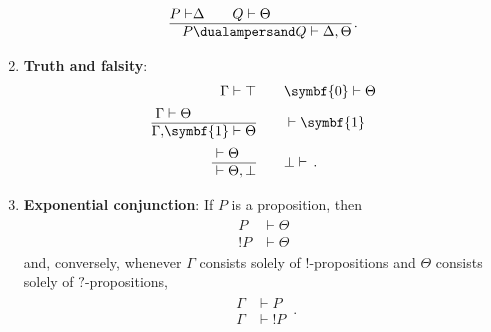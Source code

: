 \begin{enumerate}
\begin{gather}
\begin{aligned}
                    P\vdash&\Delta\qquad Q\vdash\Theta\\
                    \hline
                    P&\dualampersand Q\vdash\Delta,\Theta
                \end{aligned}\,.
            \end{gather}
        \item\textbf{Truth and falsity}:
            \begin{gather}
                \begin{aligned}
                    \Gamma\vdash\top &\qquad \symbf{0}\vdash\Theta\\
                    \begin{aligned}
                        \Gamma&\vdash\Theta\\
                        \hline
                        \Gamma,&\symbf{1}\vdash\Theta
                    \end{aligned}
                    &\qquad \vdash\symbf{1}
                    \\
                    \begin{aligned}
                        &\vdash\Theta\\
                        \hline
                        &\vdash\Theta,\bot
                    \end{aligned}
                    &\qquad \bot\vdash\,.
                \end{aligned}
            \end{gather}
        \item\textbf{Exponential conjunction}: If $P$ is a proposition, then
            \begin{gather}
                \begin{aligned}
                    P&\vdash\Theta\\
                    \hline
                    !P&\vdash\Theta
                \end{aligned}
            \end{gather}
            and, conversely, whenever $\Gamma$ consists solely of $!$-propositions and $\Theta$ consists solely of $?$-propositions,
            \begin{gather}
                \begin{aligned}
                    \Gamma&\vdash P\\
                    \hline
                    \Gamma&\vdash!P
                \end{aligned}\,.
            \end{gather}

\end{enumerate}
